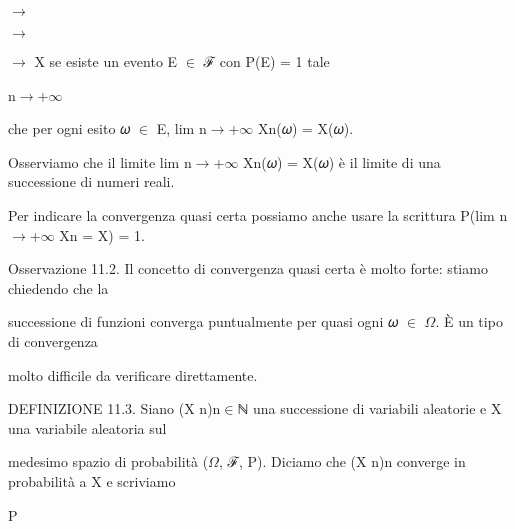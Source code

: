 \documentclass[a4paper,portrait,12pt]{article}
\begin{document}
$\rightarrow$


$\rightarrow$


\begin{flushleft}
$\rightarrow$ X se esiste un evento E $\in$ ℱ con P(E) = 1 tale
\end{flushleft}


\begin{flushleft}
n$\rightarrow$+$\infty$
\end{flushleft}


\begin{flushleft}
che per ogni esito 𝜔 $\in$ E, lim n$\rightarrow$+$\infty$ Xn(𝜔) = X(𝜔).
\end{flushleft}


\begin{flushleft}
Osserviamo che il limite lim n$\rightarrow$+$\infty$ Xn(𝜔) = X(𝜔) \`{e} il limite di una successione di numeri reali.
\end{flushleft}


\begin{flushleft}
Per indicare la convergenza quasi certa possiamo anche usare la scrittura P(lim n$\rightarrow$+$\infty$ Xn = X) = 1.
\end{flushleft}


\begin{flushleft}
Osservazione 11.2. Il concetto di convergenza quasi certa \`{e} molto forte: stiamo chiedendo che la
\end{flushleft}


\begin{flushleft}
successione di funzioni converga puntualmente per quasi ogni 𝜔 $\in$ $\Omega$. \`{E} un tipo di convergenza
\end{flushleft}


\begin{flushleft}
molto difficile da verificare direttamente.
\end{flushleft}


\begin{flushleft}
DEFINIZIONE 11.3. Siano (X n)n$\in$ℕ una successione di variabili aleatorie e X una variabile aleatoria sul
\end{flushleft}


\begin{flushleft}
medesimo spazio di probabilit\`{a} ($\Omega$, ℱ, P). Diciamo che (X n)n converge in probabilit\`{a} a X e scriviamo
\end{flushleft}


\begin{flushleft}
P
\end{flushleft}
\end{document}
